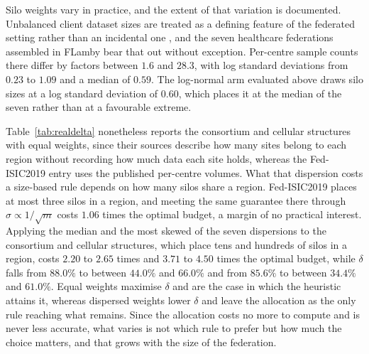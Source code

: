 \documentclass[acmsmall,screen,review,anonymous]{acmart}
\theoremstyle{acmdefinition}%
\begin{document}
Silo weights vary in practice, and the extent of that variation is documented. Unbalanced client dataset
sizes are treated as a defining feature of the federated setting rather than an incidental
one \cite{kairouz2021advances}, and the seven healthcare federations assembled in FLamby
\cite{terrail2022flamby} bear that out without exception. Per-centre sample counts there
differ by factors between $1.6$ and $28.3$, with log standard deviations from $0.23$ to
$1.09$ and a median of $0.59$. The log-normal arm evaluated above draws silo sizes at a log
standard deviation of $0.60$, which places it at the median of the seven rather than at a
favourable extreme.

Table~\ref{tab:realdelta} nonetheless reports the consortium and cellular structures with
equal weights, since their sources describe how many sites belong to each region without
recording how much data each site holds, whereas the Fed-ISIC2019 entry uses the published
per-centre volumes. What that dispersion costs a size-based rule depends on how many silos
share a region. Fed-ISIC2019 places at most three silos in a region, and meeting the same
guarantee there through $\sigma \propto 1/\sqrt{m}$ costs $1.06$ times the optimal budget,
a margin of no practical interest. Applying the median and the most skewed of the seven
dispersions to the consortium and cellular structures, which place tens and hundreds of
silos in a region, costs $2.20$ to $2.65$ times and $3.71$ to $4.50$ times the optimal
budget, while $\delta$ falls from $88.0\%$ to between $44.0\%$ and $66.0\%$ and from
$85.6\%$ to between $34.4\%$ and $61.0\%$. Equal weights maximise $\delta$ and are the case
in which the heuristic attains it, whereas dispersed weights lower $\delta$ and leave the
allocation as the only rule reaching what remains. Since the allocation costs no more to
compute and is never less accurate, what varies is not which rule to prefer but how much
the choice matters, and that grows with the size of the federation.
\end{document}
